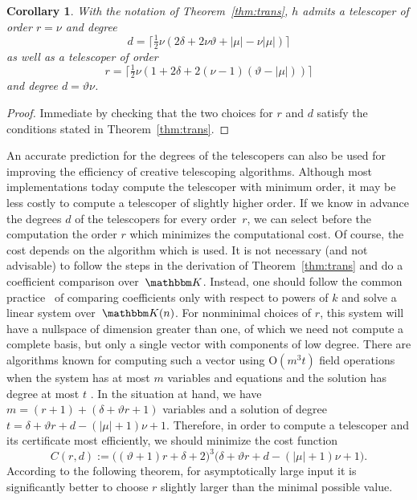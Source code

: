 \documentclass{sig-alternate}
\newtheorem{corollary}[theorem]{Corollary}
\let\set\mathbbm
\def\K{\set K}
\def\O{\mathrm{O}}
\begin{document}
\begin{corollary}
  With the notation of Theorem~\ref{thm:trans}, $h$ admits a telescoper of
  order $r=\nu$ and degree
  \[
    d=\bigl\lceil\tfrac12\nu(2\delta+2\nu\vartheta+|\mu|-\nu|\mu|)\bigr\rceil
  \]
  as well as a telescoper of order
  \[
    r = \bigl\lceil\tfrac12\nu(1+2\delta+2(\nu-1)(\vartheta-|\mu|))\bigr\rceil
  \]
  and degree $d=\vartheta\nu$.
\end{corollary}
\begin{proof}
  Immediate by checking that the two choices for $r$ and $d$ satisfy the conditions
  stated in Theorem~\ref{thm:trans}.
\end{proof}

An accurate prediction for the degrees of the telescopers can also be used for improving the efficiency
of creative telescoping algorithms. Although most implementations today compute the telescoper
with minimum order, it may be less costly to compute a telescoper of slightly higher order. If
we know in advance the degrees $d$ of the telescopers for every order~$r$, we can select before
the computation the order $r$ which minimizes the computational cost. Of course, the cost depends
on the algorithm which is used. It is not necessary (and not advisable) to follow the steps in the
derivation of Theorem~\ref{thm:trans} and do a coefficient comparison over~$\K$. Instead, one should
follow the common practice~\cite{koutschan10b} of comparing coefficients only with respect to powers of $k$
and solve a linear system over~$\K(n)$. For nonminimal choices of $r$, this system will have a
nullspace of dimension greater than one, of which we need not compute a complete basis,
but only a single vector with components of low degree. There are algorithms known for computing
such a vector using $\O(m^3t)$ field operations when the system has at most $m$ variables and equations and the
solution has degree at most $t$ \cite{beckermann94,storjohann05,bostan07}. In the situation at hand, we have
$m=(r+1)+(\delta+\vartheta r+1)$ variables and a solution of degree $t=\delta+\vartheta r+d-(|\mu|+1)\nu+1$.
Therefore, in order to compute a telescoper
and its certificate most efficiently, we should minimize the cost function
\[
 C(r,d):=\bigl((\vartheta+1)r+\delta+2\bigr)^3\bigl(\delta+\vartheta r+d-(|\mu|+1)\nu+1\bigr).
\]
According to the following theorem, for asymptotically large input it is significantly better to
choose $r$ slightly larger than the minimal possible value.
\end{document}

